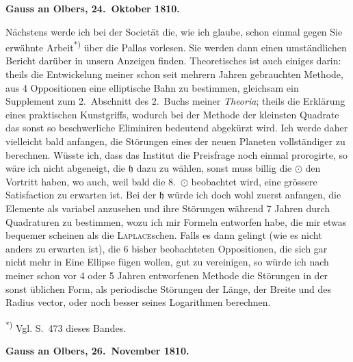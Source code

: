 \documentclass[12pt,a4paper]{article}
\newcommand{\Ceres}{\odot}
\newcommand{\Jupiter}{\mathfrak{h}}
\begin{document}
\medskip\noindent
\textbf{Gauss an Olbers, 24.~Oktober 1810.}

Nächstens werde ich bei der Societät die, wie ich glaube, schon einmal gegen Sie erwähnte Arbeit\textsuperscript{*)} über die Pallas vorlesen. Sie werden dann einen umständlichen Bericht darüber in unsern Anzeigen finden. Theoretisches ist auch einiges darin: theils die Entwickelung meiner schon seit mehrern Jahren gebrauchten Methode, aus 4 Oppositionen eine elliptische Bahn zu bestimmen, gleichsam ein Supplement zum 2.~Abschnitt des 2.~Buchs meiner \textit{Theoria}; theils die Erklärung eines praktischen Kunstgriffs, wodurch bei der Methode der kleinsten Quadrate das sonst so beschwerliche Eliminiren bedeutend abgekürzt wird. Ich werde daher vielleicht bald anfangen, die Störungen eines der neuen Planeten vollständiger zu berechnen. Wüsste ich, dass das Institut die Preisfrage noch einmal prorogirte, so wäre ich nicht abgeneigt, die $\Jupiter$ dazu zu wählen, sonst muss billig die $\Ceres$ den Vortritt haben, wo auch, weil bald die 8.~$\Ceres$ beobachtet wird, eine grössere Satisfaction zu erwarten ist. Bei der $\Jupiter$ würde ich doch wohl zuerst anfangen, die Elemente als variabel anzusehen und ihre Störungen während 7 Jahren durch Quadraturen zu bestimmen, wozu ich mir Formeln entworfen habe, die mir etwas bequemer scheinen als die \textsc{Laplace}schen. Falls es dann gelingt (wie es nicht anders zu erwarten ist), die 6 bisher beobachteten Oppositionen, die sich gar nicht mehr in Eine Ellipse fügen wollen, gut zu vereinigen, so würde ich nach meiner schon vor 4 oder 5 Jahren entworfenen Methode die Störungen in der sonst üblichen Form, als periodische Störungen der Länge, der Breite und des Radius vector, oder noch besser seines Logarithmen berechnen.

\smallskip\noindent\textsuperscript{*)} Vgl. S.~473 dieses Bandes.

\newpage
\setcounter{page}{425}
%
\medskip\noindent
\textbf{Gauss an Olbers, 26.~November 1810.}
\end{document}
